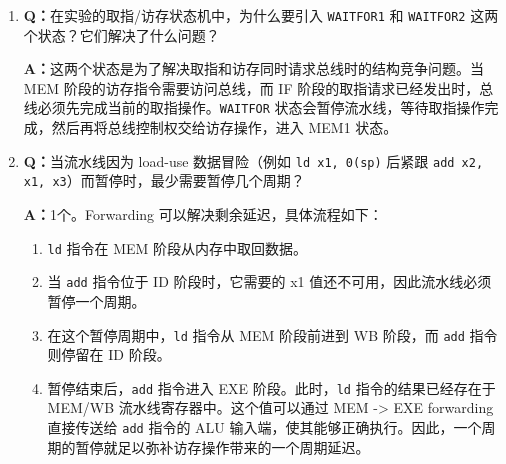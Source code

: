 \begin{enumerate}
    \textbf{A：}状态机设计本身仍然可以正常工作。因为它是基于 \texttt{valid/ready} 来驱动状态转换的，无论设备响应多慢，状态机都会停留在等待状态直到收到 \texttt{reply\_valid} 信号。

    \item \textbf{Q：}在实验的取指/访存状态机中，为什么要引入 \texttt{WAITFOR1} 和 \texttt{WAITFOR2} 这两个状态？它们解决了什么问题？

    \textbf{A：}这两个状态是为了解决取指和访存同时请求总线时的结构竞争问题。当 MEM 阶段的访存指令需要访问总线，而 IF 阶段的取指请求已经发出时，总线必须先完成当前的取指操作。\texttt{WAITFOR} 状态会暂停流水线，等待取指操作完成，然后再将总线控制权交给访存操作，进入 MEM1 状态。

    \item \textbf{Q：}当流水线因为 load-use 数据冒险（例如 \texttt{ld x1, 0(sp)} 后紧跟 \texttt{add x2, x1, x3}）而暂停时，最少需要暂停几个周期？

    \textbf{A：}1个。Forwarding 可以解决剩余延迟，具体流程如下：
    \begin{enumerate}
        \item \texttt{ld} 指令在 MEM 阶段从内存中取回数据。
        \item 当 \texttt{add} 指令位于 ID 阶段时，它需要的 x1 值还不可用，因此流水线必须暂停一个周期。
        \item 在这个暂停周期中，\texttt{ld} 指令从 MEM 阶段前进到 WB 阶段，而 \texttt{add} 指令则停留在 ID 阶段。
        \item 暂停结束后，\texttt{add} 指令进入 EXE 阶段。此时，\texttt{ld} 指令的结果已经存在于 MEM/WB 流水线寄存器中。这个值可以通过 MEM -> EXE forwarding 直接传送给 \texttt{add} 指令的 ALU 输入端，使其能够正确执行。因此，一个周期的暂停就足以弥补访存操作带来的一个周期延迟。
    \end{enumerate}
\end{enumerate}
